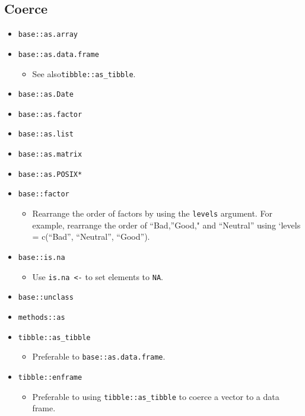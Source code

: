 \documentclass[
]{book}
\providecommand{\tightlist}{%
  \setlength{\itemsep}{0pt}\setlength{\parskip}{0pt}}
\begin{document}
\hypertarget{coerce}{%
\subsection{Coerce}\label{coerce}}

\begin{itemize}
\tightlist
\item
  \texttt{base::as.array}
\item
  \texttt{base::as.data.frame}

  \begin{itemize}
  \tightlist
  \item
    See also\texttt{tibble::as\_tibble}.
  \end{itemize}
\item
  \texttt{base::as.Date}
\item
  \texttt{base::as.factor}
\item
  \texttt{base::as.list}
\item
  \texttt{base::as.matrix}
\item
  \texttt{base::as.POSIX*}
\item
  \texttt{base::factor}

  \begin{itemize}
  \tightlist
  \item
    Rearrange the order of factors by using the \texttt{levels} argument. For example, rearrange the order of ``Bad,''Good," and ``Neutral'' using `levels = c(``Bad'', ``Neutral'', ``Good'').
  \end{itemize}
\item
  \texttt{base::is.na}

  \begin{itemize}
  \tightlist
  \item
    Use \texttt{is.na\ \textless{}-} to set elements to \texttt{NA}.
  \end{itemize}
\item
  \texttt{base::unclass}
\item
  \texttt{methods::as}
\item
  \texttt{tibble::as\_tibble}

  \begin{itemize}
  \tightlist
  \item
    Preferable to \texttt{base::as.data.frame}.
  \end{itemize}
\item
  \texttt{tibble::enframe}

  \begin{itemize}
  \tightlist
  \item
    Preferable to using \texttt{tibble::as\_tibble} to coerce a vector to a data frame.
  \end{itemize}
\end{itemize}
\end{document}
